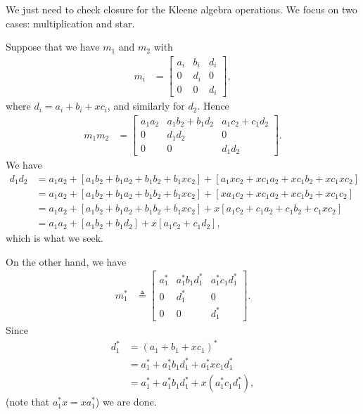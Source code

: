 \documentclass[a4paper,UKenglish,cleveref, autoref, thm-restate]{lipics-v2021}
\begin{document}
\begin{proofEnd}
  We just need to check closure for the Kleene algebra operations. We focus on
  two cases: multiplication and star.

  Suppose that we have $m_1$ and $m_2$ with
  \begin{align*}
    m_i & =
             \begin{bmatrix}
               a_i & b_i & d_i \\
               0 & d_i & 0 \\
               0 & 0 & d_i
             \end{bmatrix},
  \end{align*}
  where $d_i = a_i + b_i + xc_i$, and similarly for $d_2$.  Hence
  \begin{align*}
    m_1m_2 & =
                \begin{bmatrix}
                  a_1a_2 & a_1b_2 + b_1d_2 & a_1c_2 + c_1d_2 \\
                  0 & d_1d_2 & 0 \\
                  0 & 0 & d_1d_2
                \end{bmatrix}.
  \end{align*}
  We have
  \begin{align*}
    d_1d_2
    & = a_1a_2 + [a_1b_2 + b_1a_2 + b_1b_2 + b_1xc_2]
      + [a_1xc_2 + xc_1a_2 + xc_1b_2 + xc_1xc_2] \\
    & = a_1a_2 + [a_1b_2 + b_1a_2 + b_1b_2 + b_1xc_2]
      + [xa_1c_2 + xc_1a_2 + xc_1b_2 + xc_1c_2] \\
    & = a_1a_2 + [a_1b_2 + b_1a_2 + b_1b_2 + b_1xc_2]
      + x [a_1c_2 + c_1a_2 + c_1b_2 + c_1xc_2] \\
    & = a_1a_2 + [a_1b_2 + b_1d_2] + x[a_1c_2 + c_1d_2],
  \end{align*}
  which is what we seek.

  On the other hand, we have
  \begin{align*}
    m_1^*
    &  \triangleq 
      \begin{bmatrix}
        a_1^* & a_1^*b_1d_1^* & a_1^*c_1d_1^* \\
        0 & d_1^* & 0 \\
        0 & 0 & d_1^*
      \end{bmatrix}.
  \end{align*}
  Since
  \begin{align*}
    d_1^* & = (a_1 + b_1 + xc_1)^*  \\
          & = a_1^* + a_1^*b_1d_1^* + a_1^*xc_1d_1^* \\
          & = a_1^* + a_1^*b_1d_1^* + x(a_1^*c_1d_1^*),
  \end{align*}
  (note that $a_1^*x = xa_1^*$) we are done.
\end{proofEnd}
\end{document}

